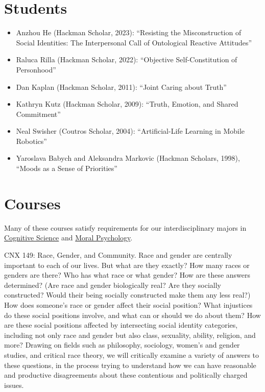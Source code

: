 \documentclass[%
  11pt,%
]{article}
\begin{document}
\section{Students}

\begin{itemize}

  \item Anzhou He (Hackman Scholar, 2023): \enquote{Resisting the Misconstruction of Social Identities: The Interpersonal Call of Ontological Reactive Attitudes}
  \item Raluca Rilla (Hackman Scholar, 2022): \enquote{Objective Self-Constitution of Personhood}
  \item Dan Kaplan (Hackman Scholar, 2011): \enquote{Joint Caring about Truth}
  \item Kathryn Kutz (Hackman Scholar, 2009): \enquote{Truth, Emotion, and Shared Commitment}
  \item Neal Swisher (Coutros Scholar, 2004): \enquote{Artificial-Life Learning in Mobile Robotics}
  \item Yaroslava Babych and Aleksandra Markovic (Hackman Scholars, 1998), \enquote{Moods as a Sense of Priorities}

\end{itemize}

\section{Courses}

Many of these courses satisfy requirements for our interdisciplinary majors in \href{https://www.fandm.edu/fields-of-study/cognitive-science/index.html}{Cognitive Science} and \href{https://www.fandm.edu/fields-of-study/moral-psychology/index.html}{Moral Psychology}.
\medskip{}

\begin{htmlcourse}{CNX 149: Race, Gender, and Community.}
  Race and gender are centrally important to each of our lives. But what are they exactly? How many races or genders are there? Who has what race or what gender? How are these answers determined? (Are race and gender biologically real? Are they socially constructed? Would their being socially constructed make them any less real?) How does someone's race or gender affect their social position? What injustices do these social positions involve, and what can or should we do about them? How are these social positions affected by intersecting social identity categories, including not only race and gender but also class, sexuality, ability, religion, and more? Drawing on fields such as philosophy, sociology, women's and gender studies, and critical race theory, we will critically examine a variety of answers to these questions, in the process trying to understand how we can have reasonable and productive disagreements about these contentious and politically charged issues.
\end{htmlcourse}
\end{document}
